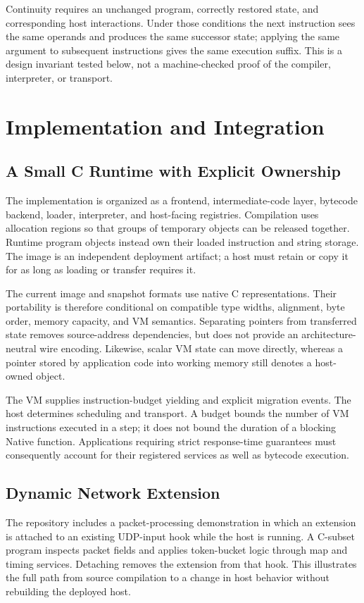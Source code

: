 \documentclass[conference,letterpaper]{IEEEtran}
\begin{document}
Continuity requires an unchanged program, correctly restored state, and corresponding host interactions. Under those conditions the next instruction sees the same operands and produces the same successor state; applying the same argument to subsequent instructions gives the same execution suffix. This is a design invariant tested below, not a machine-checked proof of the compiler, interpreter, or transport.

\section{Implementation and Integration}
\subsection{A Small C Runtime with Explicit Ownership}
The implementation is organized as a frontend, intermediate-code layer, bytecode backend, loader, interpreter, and host-facing registries. Compilation uses allocation regions so that groups of temporary objects can be released together. Runtime program objects instead own their loaded instruction and string storage. The image is an independent deployment artifact; a host must retain or copy it for as long as loading or transfer requires it.

The current image and snapshot formats use native C representations. Their portability is therefore conditional on compatible type widths, alignment, byte order, memory capacity, and VM semantics. Separating pointers from transferred state removes source-address dependencies, but does not provide an architecture-neutral wire encoding. Likewise, scalar VM state can move directly, whereas a pointer stored by application code into working memory still denotes a host-owned object.

The VM supplies instruction-budget yielding and explicit migration events. The host determines scheduling and transport. A budget bounds the number of VM instructions executed in a step; it does not bound the duration of a blocking Native function. Applications requiring strict response-time guarantees must consequently account for their registered services as well as bytecode execution.

\subsection{Dynamic Network Extension}
The repository includes a packet-processing demonstration in which an extension is attached to an existing UDP-input hook while the host is running. A C-subset program inspects packet fields and applies token-bucket logic through map and timing services. Detaching removes the extension from that hook. This illustrates the full path from source compilation to a change in host behavior without rebuilding the deployed host.
\end{document}
